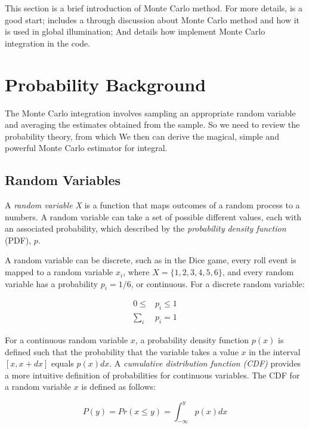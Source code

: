 This section is a brief introduction of Monte Carlo method. For more details, \cite[-30mm]{a:EfficientMonteCarloMethodsforLightTransportinScatteringMedia} is a good start; \cite[-15mm]{b:AdvancedGlobalIllumination} includes a through discussion about Monte Carlo method and how it is used in global illumination; And \cite[-5mm]{b:pbrt} details how implement Monte Carlo integration in the code.



\section{Probability Background}
The Monte Carlo integration involves sampling an appropriate random variable and averaging the estimates obtained from the sample. So we need to review the probability theory, from which We then can derive the magical, simple and powerful Monte Carlo estimator for integral. 

\subsection{Random Variables}
A \textit{random variable X} is a function that maps outcomes of a random process to a numbers. A random variable can take a set of possible different values, each with an associated probability, which described by the \textit{probability density function} (PDF), $p$. 

A random variable can be discrete, such as in the Dice game, every roll event is mapped to a random variable $x_i$, where $X=\{1,2,3,4,5,6\}$, and every random variable has a probability $p_i=1/6$, or continuous. For a discrete random variable:

\begin{equation}
	\begin{aligned}
		0\leq &p_i \leq 1 \\
		\sum_i &p_i=1
	\end{aligned}
\end{equation}

For a continuous random variable $x$, a probability density function  $p(x)$ is defined such that the probability that the variable takes a value $x$ in the interval $[x,x+dx]$ equals $p(x)dx$. A \textit{cumulative distribution function (CDF)} provides a more intuitive definition of probabilities for continuous variables. The CDF for a random variable $x$ is defined as follows:

\begin{equation}
	P(y)=Pr(x\leq y)=\int_{-\infty}^{y}p(x)dx
\end{equation}

